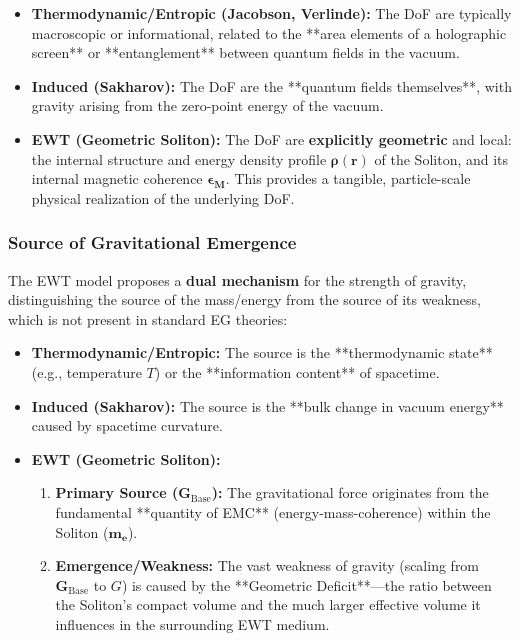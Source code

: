 \documentclass[10pt,a4paper]{article}
\begin{document}
\begin{itemize}
	\item \textbf{Thermodynamic/Entropic (Jacobson, Verlinde):} The DoF are typically macroscopic or informational, related to the **area elements of a holographic screen** or **entanglement** between quantum fields in the vacuum.
	\item \textbf{Induced (Sakharov):} The DoF are the **quantum fields themselves**, with gravity arising from the zero-point energy of the vacuum.
	\item \textbf{EWT (Geometric Soliton):} The DoF are \textbf{explicitly geometric} and local: the internal structure and energy density profile $\mathbf{\rho(r)}$ of the Soliton, and its internal magnetic coherence $\mathbf{\epsilon_M}$. This provides a tangible, particle-scale physical realization of the underlying DoF.
\end{itemize}

\subsubsection{Source of Gravitational Emergence}

The EWT model proposes a \textbf{dual mechanism} for the strength of gravity, distinguishing the source of the mass/energy from the source of its weakness, which is not present in standard EG theories:

\begin{itemize}
	\item \textbf{Thermodynamic/Entropic:} The source is the **thermodynamic state** (e.g., temperature $T$) or the **information content** of spacetime.
	\item \textbf{Induced (Sakharov):} The source is the **bulk change in vacuum energy** caused by spacetime curvature.
	\item \textbf{EWT (Geometric Soliton):}
	\begin{enumerate}[label=\alph*)]
		\item \textbf{Primary Source ($\mathbf{G}_{\text{Base}}$):} The gravitational force originates from the fundamental **quantity of EMC** (energy-mass-coherence) within the Soliton ($\mathbf{m_e}$).
		\item \textbf{Emergence/Weakness:} The vast weakness of gravity (scaling from $\mathbf{G}_{\text{Base}}$ to $G$) is caused by the **Geometric Deficit**—the ratio between the Soliton's compact volume and the much larger effective volume it influences in the surrounding EWT medium.
	\end{enumerate}
\end{itemize}
\end{document}
